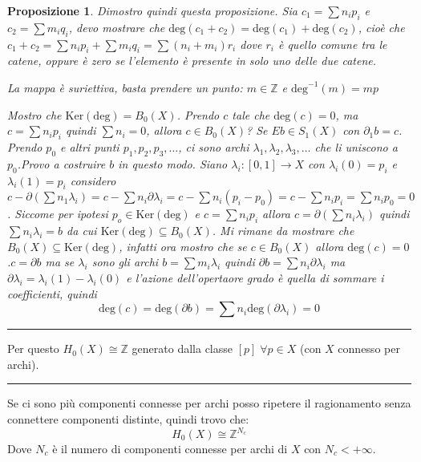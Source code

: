 \documentclass[10pt, twoside=false, x11names]{scrbook}
\newtheorem{proposition}[theorem]{Proposizione}
\newenvironment{proof}{{\textbf{Dimostrazione}:}}{\hfill\rule{2mm}{2mm} \newline}
\newcommand{\Z}{\mathbb{Z}}
\renewcommand{\ker}[1]{\mathrm{Ker}( #1)}
\begin{document}
\begin{proof}
\begin{proposition}
    Dimostro quindi questa proposizione.
    \begin{proof}
      Sia $ c_1 = \sum n_i p_i $ e $ c_2 = \sum m_i q_i $, devo mostrare che $ \mathrm{deg}(c_1 + c_2) = \mathrm{deg}(c_1) + \mathrm{deg}(c_2) $,
      cioè che $ c_1 + c_2 = \sum n_i p_i + \sum m_i q_i = \sum (n_i + m_i)r_i $ dove $ r_i $ è quello comune tra le catene, oppure è zero se
      l'elemento è presente in solo uno delle due catene.

      La mappa è suriettiva, basta prendere un punto: $ m \in \Z $ e $ \mathrm{deg}^{-1}(m) = mp $

      Mostro che $ \ker{\mathrm{deg}} = B_0(X) $. Prendo $ c $ tale che $ \mathrm{deg}(c) = 0 $, ma
      $ c = \sum n_i p_i $ quindi $ \sum n_i = 0 $, allora $ c \in B_0(X) $?
      Se $ E b \in S_1(X) $ con $ \partial_1 b = c $. Prendo $ p_0 $ e altri punti $ p_1, p_2, p_3, \dots $, ci sono archi
      $ \lambda_1, \lambda_2, \lambda_3, \dots $ che li uniscono a $ p_0 $.Provo a costruire $ b $ in questo modo. Siano
      $ \lambda_i : [0,1] \to X $ con $ \lambda_i(0) = p_i $ e $ \lambda_i(1) = p_i $ considero $ c - \partial\left(\sum n_1 \lambda_i \right) =
      c - \sum n_i \partial \lambda_i = c - \sum n_i (p_i - p_0) = c - \sum n_i p_i = \sum n_i p_0 = 0 $. Siccome per ipotesi $ p_o \in \ker{\mathrm{deg}} $
      e $ c = \sum n_i p_i $ allora $ c = \partial(\sum n_i \lambda_i) $ quindi $ \sum n_i \lambda_i = b $ da cui $ \ker{\mathrm{deg}} \subseteq B_0(X) $.
      Mi rimane da mostrare che $ B_0(X) \subseteq \ker{\mathrm{deg}} $, infatti ora mostro che se $ c \in B_0(X) $ allora
      $ \mathrm{deg}(c) = 0 $.$ c = \partial b $ ma se $ \lambda_i $ sono gli archi $ b = \sum m_i \lambda_i $ quindi  $ \partial b = \sum n_i \partial \lambda_i $
      ma $ \partial \lambda_i = \lambda_i(1) - \lambda_i(0) $ e l'azione dell'opertaore grado è quella di sommare i coefficienti, quindi
      \[
        \mathrm{deg}(c) = \mathrm{deg}(\partial b) = \sum n_i \mathrm{deg}(\partial \lambda_i) = 0
      \]
    \end{proof}
  \end{proposition}
  Per questo $ H_0 (X) \cong \Z $ generato dalla classe $ [p] \; \forall p \in X $ (con $ X $ connesso per archi).
\end{proof}
Se ci sono più componenti connesse per archi posso ripetere il ragionamento senza connettere componenti
distinte, quindi trovo che:
\[
  H_0(X) \cong \Z^{N_c}
\]
Dove $ N_c $ è il numero di componenti connesse per archi di $ X $ con $ N_c < + \infty $.
\end{document}

